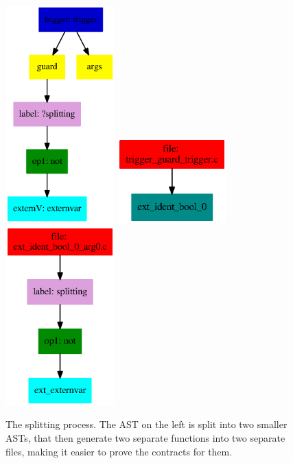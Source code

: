 \begin{figure}[!htb]
	\vspace*{2cm}
	\includegraphics[width=42mm]{images/label/main.ps}
	\includegraphics[width=42mm]{images/label/splitted.ps}
	\includegraphics[width=42mm]{images/label/splitted2.ps}
	\caption{The splitting process. The AST on the left is split into two smaller ASTs, that then generate two separate functions into two separate files, making it easier to prove the contracts for them.}
	\label{fig:splitting label}
\end{figure}

